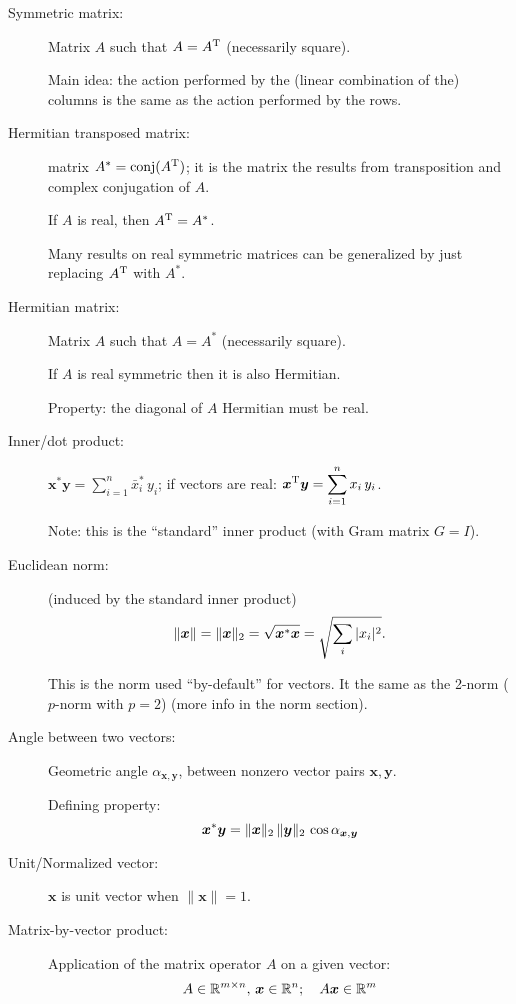 \documentclass[
  12pt,
  paper=a4,
]{scrartcl} %
\begin{document}
\begin{description}
\item[Symmetric matrix:] Matrix $A$ such that $A = A^{\mathrm{T}}$ (necessarily square).

Main idea: the action performed by the (linear combination of the) columns is the same as the action performed by the rows.

\item[Hermitian transposed matrix:] matrix $A^* = \mathrm{conj}(A^{\mathrm{T}})$; it is the matrix  the results from transposition and complex conjugation of $A$.

If $A$ is real, then $A^{\mathrm{T}} = A^{*}$.

Many results on real symmetric matrices can be generalized by just replacing $A^{\mathrm{T}}$ with $A^*$.

\item[Hermitian matrix:] Matrix $A$ such that $A = A^*$ (necessarily square).

If $A$ is real symmetric then it is also Hermitian.

Property: the diagonal of $A$ Hermitian must be real.

\item[Inner/dot product:]
$\displaystyle\bm x^* \bm y =\sum_{i=1}^n \bar x_i^*\, y_i$; if vectors are real: $\displaystyle\bm x^{\mathrm{T}} \bm y =\sum_{i=1}^n x_i\, y_i$.

Note: this is the ``standard'' inner product (with Gram matrix $G=I$).

\item[Euclidean norm:] (induced by the standard inner product) \[\|\bm x\| = \|\bm x\|_2= \sqrt{\bm x^* \bm x} = \sqrt{\sum_i |x_i|^2}.\]

This is the norm used ``by-default'' for vectors. It the same as the 2-norm ($p$-norm with $p=2$) (more info in the norm section).

\item[Angle between two vectors:]{} Geometric angle $\alpha_{\bm x,\bm y}$,  between nonzero vector pairs $\bm x,\bm y$.

Defining property: 
\[\bm x^* \bm y = \|\bm x\|_2\,\|\bm y\|_2\,\cos \alpha_{\bm x,\bm y}\]

\item[Unit/Normalized vector:] $\bm x$ is unit vector when $\|\bm x\|=1$.

\item[Matrix-by-vector product:] Application of the matrix operator $A$ on a given vector:
\[
A\in\mathbb R^{m\times n},\,\bm x\in \mathbb R^n;\quad A\bm x \in \mathbb R^m
\]


\end{description}
\end{document}
